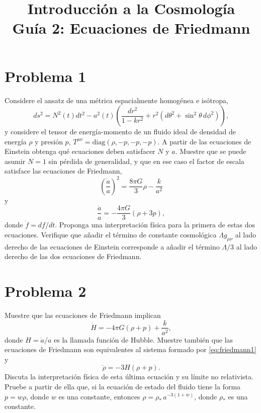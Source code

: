 \documentclass[11pt,a4paper]{article}
\title{\textbf{Introducción a la Cosmología \\ Guía 2: Ecuaciones de Friedmann}}
\date{}
\begin{document}
\maketitle

\section*{Problema 1}
Considere el ansatz de una métrica espacialmente homogénea e isótropa,
\begin{equation}
  ds^2=N^2(t)dt^2-a^2(t)\left(\frac{dr^2}{1-kr^2}+r^2\left(d\theta^2+\sin^2\theta\,d\phi^2\right)\right),
\end{equation}
y considere el tensor de energía-momento de un fluido ideal de densidad de energía $\rho$ y presión $p$, $T^{\mu\nu}=\text{diag}(\rho,-p,-p,-p)$. A partir de las ecuaciones de Einstein obtenga qué ecuaciones deben satisfacer $N$ y $a$. Muestre que se puede asumir $N=1$ sin pérdida de generalidad, y que en ese caso el factor de escala satisface las ecuaciones de Friedmann,
\begin{equation}
  \left(\frac{\dot a}{a}\right)^2=\frac{8\pi G}{3}\rho-\frac{k}{a^2} \label{eq:friedmann1}
\end{equation}
y
\begin{equation}
  \frac{\ddot a}{a}=-\frac{4\pi G}{3}(\rho+3p), \label{eq:friedmann2}
\end{equation}
donde $\dot f=df/dt$. Proponga una interpretación física para la primera de estas dos ecuaciones. Verifique que añadir el término de constante cosmológica $\Lambda g_{\mu\nu}$ al lado derecho de las ecuaciones de Einstein corresponde a añadir el término $\Lambda/3$ al lado derecho de las dos ecuaciones de Friedmann.

\section*{Problema 2}
Muestre que las ecuaciones de Friedmann implican
\begin{equation}
  \dot H=-4\pi G(\rho+p)+\frac{k}{a^2},
\end{equation}
donde $H=\dot a/a$ es la llamada función de Hubble. Muestre también que las ecuaciones de Friedmann son equivalentes al sistema formado por \eqref{eq:friedmann1} y
\begin{equation}
  \dot\rho=-3H(\rho+p). \label{eq:continuidad}
\end{equation}
Discuta la interpretación física de esta última ecuación y su límite no relativista. Pruebe a partir de ella que, si la ecuación de estado del fluido tiene la forma $p=w\rho$, donde $w$ es una constante, entonces $\rho=\rho_*\,a^{-3(1+w)}$, donde $\rho_*$ es una constante.
\end{document}

